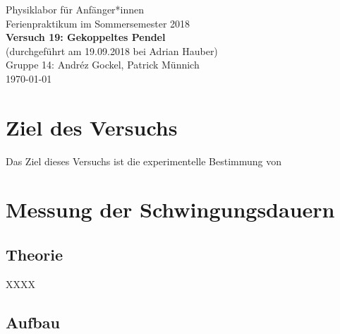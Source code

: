 \documentclass[11pt,a4paper]{article}
\begin{document}
{
\centering 
\large 
Physiklabor für Anf\"anger*innen \\
Ferienpraktikum im Sommersemester 2018 \\[4mm]
\textbf{\LARGE 
Versuch 19: Gekoppeltes Pendel 
} \\[3mm]
(durchgef\"uhrt am 19.09.2018 bei Adrian Hauber) \\
Gruppe 14: Andréz Gockel, Patrick M\"unnich\\
\today \\[10mm]
}

\vspace{50pt}
\tableofcontents
\vspace{22pt}
\listoftables
\vspace{22pt}
\listoffigures
\pagebreak

\section{Ziel des Versuchs}
Das Ziel dieses Versuchs ist die experimentelle Bestimmung von 

\section{Messung der Schwingungsdauern}

\subsection{Theorie}

XXXX

\subsection{Aufbau}
\end{document}
